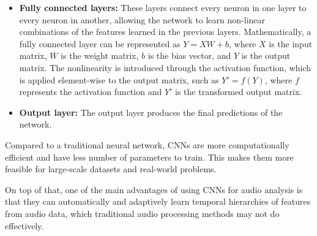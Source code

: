 \begin{itemize}
\item \textbf{Fully connected layers:} These layers connect every neuron in one layer to every neuron in another, allowing the network to learn non-linear combinations of the features learned in the previous layers. Mathematically, a fully connected layer can be represented as $Y = XW + b$, where $X$ is the input matrix, $W$ is the weight matrix, $b$ is the bias vector, and $Y$ is the output matrix. The nonlinearity is introduced through the activation function, which is applied element-wise to the output matrix, such as $Y' = f(Y)$, where $f$ represents the activation function and $Y'$ is the transformed output matrix.
\vspace*{3mm}

\item \textbf{Output layer:} The output layer produces the final predictions of the network.

\end{itemize}

Compared to a traditional neural network, CNNs are more computationally efficient and have less number of parameters to train. This makes them more feasible for large-scale datasets and real-world problems.

On top of that, one of the main advantages of using CNNs for audio analysis is that they can automatically and adaptively learn temporal hierarchies of features from audio data, which traditional audio processing methods may not do effectively. 







\newpage


